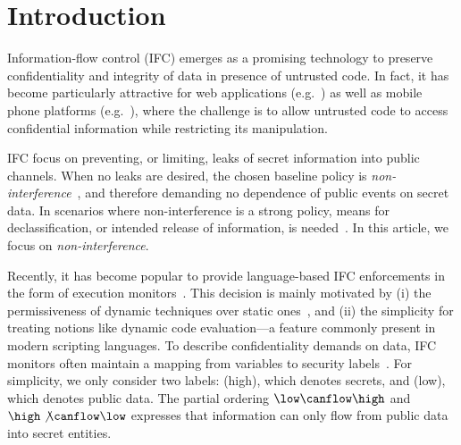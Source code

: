 \section{Introduction}
\label{sec:intro}

Information-flow control (IFC) emerges as a promising technology to preserve
confidentiality and integrity of data in presence of untrusted code.  In fact,
it has become particularly attractive for web applications
(e.g.~\citep{DeGroef:2012:FWB:2382196.2382275, giffin:hails, yang:2013:towards,
  conf/esorics/AkhaweLHSS13, Hedin13}) as well as mobile phone platforms
(e.g.~\citep{Enck:2010,android:esorics13}), where the challenge is to allow
untrusted code to access confidential information while restricting its
manipulation.

IFC focus on preventing, or limiting, leaks of secret information into public
channels. When no leaks are desired, the chosen baseline policy is
\emph{non-interference}~\citep{Goguen:Meseguer:Noninterference}, and therefore
demanding no dependence of public events on secret data. In scenarios where
non-interference is a strong policy, means for declassification, or intended
release of information, is needed~\citep{Sabelfeld:Sands:CSFW05}. In this
article, we focus on \emph{non-interference}. 

Recently, it has become popular to provide language-based IFC enforcements in
the form of execution monitors~\citep{Hedin2011}. This decision is mainly
motivated by (i) the permissiveness of dynamic techniques over static
ones~\citep{Sabelfeld:Russo:PSI09}, and (ii) the simplicity for treating notions
like dynamic code evaluation---a feature commonly present in modern scripting
languages. To describe confidentiality demands on data, IFC monitors often
maintain a mapping from variables to security
labels~\citep{myers:dlm,Stefan:2011}.  For simplicity, we only consider two
labels: \high (high), which denotes secrets, and \low (low), which denotes
public data. The partial ordering $\low \canflow \high$ and $\high \not \canflow
\low$ expresses that information can only flow from public data into secret
entities. 

